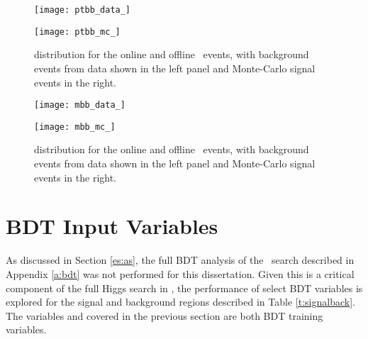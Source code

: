         \begin{figure}[h]
            \centering
            \begin{minipage}[h]{0.48\linewidth}
                \texttt{[image: ptbb\_data\_]}
            \end{minipage}
            \quad
            \begin{minipage}[h]{0.48\linewidth}
                \texttt{[image: ptbb\_mc\_]}
            \end{minipage}
            \caption[Comparison of the \ptbb distribution of the \VBFHBB\ events for HLT and offline objects]{\ptbb distribution for the online and offline \VBFHBB\ events, with background events from data shown in the left panel and Monte-Carlo signal events in the right.}
            \label{f:ptbb}
        \end{figure}

        \begin{figure}[h]
            \centering
            \begin{minipage}[h]{0.48\linewidth}
                \texttt{[image: mbb\_data\_]}
            \end{minipage}
            \quad
            \begin{minipage}[h]{0.48\linewidth}
                \texttt{[image: mbb\_mc\_]}
            \end{minipage}
            \caption[Comparison of the \mbb distribution of the \VBFHBB\ events for HLT and offline objects]{\mbb distribution for the online and offline \VBFHBB\ events, with background events from data shown in the left panel and Monte-Carlo signal events in the right.}
            \label{f:mbb}
        \end{figure}


\section{BDT Input Variables}

    As discussed in Section \ref{es:as}, the full BDT analysis of the \VBFHBB\ search described in Appendix \ref{a:bdt} was not performed for this dissertation. Given this is a critical component of the full Higgs search \cite{VBFHbb8tev} in \VBFHBB, the performance of select BDT variables is explored for the signal and background regions described in Table \ref{t:signalback}. The variables \mjj and \ptjj covered in the previous section are both BDT training variables.

